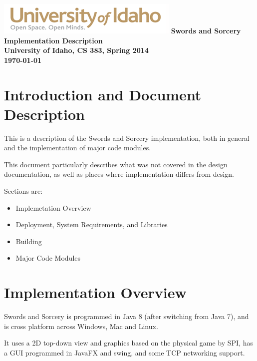\documentclass[12pt,a4paper]{article}
\begin{document}
\begin{titlepage}
    \centering
    \vfill
    \vfill
    \includegraphics{UIGraphic}
    \vfill
    {\bfseries\Large
        Swords and Sorcery Implementation Description\\
        University of Idaho, CS 383, Spring 2014\\
        \today
    }    
    \vfill
\end{titlepage}
\section{Introduction and Document Description}
This is a description of the Swords and Sorcery implementation, both in general
and the implementation of major code modules.

This document particularly describes what was not covered in the design
documentation, as well as places where implementation differs from design.

Sections are:
\begin{itemize}
\item Implemetation Overview
\item Deployment, System Requirements, and Libraries
\item Building
\item Major Code Modules
\end{itemize}

\section{Implementation Overview}
Swords and Sorcery is programmed in Java 8 (after switching from Java 7),
and is cross platform across Windows, Mac and Linux.


It uses a 2D top-down view and graphics based on the physical game by SPI,
has a GUI programmed in JavaFX and swing, and some TCP networking
support.
\end{document}
